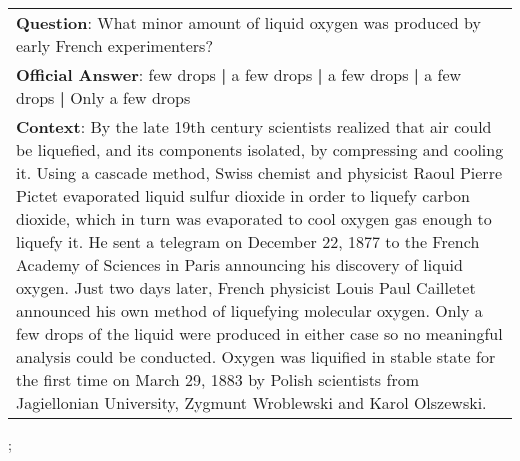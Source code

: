 \begin{figure*}[ht]
{\begin{tabular}{p{}}
            \textbf{Question}: What minor amount of liquid oxygen was produced by early French experimenters?                                                                                                                                                                                                                                                                                                                                                                                                                                                                                                                                                                                                                                                                                                                                                                                                           \\
            \textbf{Official Answer}: few drops \textbf{|} a few drops \textbf{|} a few drops \textbf{|} a few drops \textbf{|} Only a few drops                                                                                                                                                                                                                                                                                                                                                                                                                                                                                                                                                                                                                                                                                                                                                                        \\
            \textbf{Context}: By the late 19th century scientists realized that air could be liquefied, and its components isolated, by compressing and cooling it. Using a cascade method, Swiss chemist and physicist Raoul Pierre Pictet evaporated liquid sulfur dioxide in order to liquefy carbon dioxide, which in turn was evaporated to cool oxygen gas enough to liquefy it. He sent a telegram on December 22, 1877 to the French Academy of Sciences in Paris announcing his discovery of liquid oxygen. Just two days later, French physicist Louis Paul Cailletet announced his own method of liquefying molecular oxygen. Only a few drops of the liquid were produced in either case so no meaningful analysis could be conducted. Oxygen was liquified in stable state for the first time on March 29, 1883 by Polish scientists from Jagiellonian University, Zygmunt Wroblewski and Karol Olszewski. \\
        \end{tabular}
    };
    \label{fig:ex-571caac55efbb31900334dc9}
\end{figure*}

